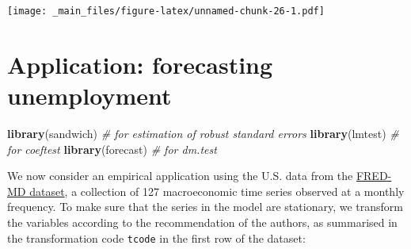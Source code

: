 \documentclass[
]{book}
\newenvironment{Shaded}{\begin{snugshade}}{\end{snugshade}}
\newcommand{\AttributeTok}[1]{\textcolor[rgb]{0.13,0.29,0.53}{#1}}
\newcommand{\CommentTok}[1]{\textcolor[rgb]{0.56,0.35,0.01}{\textit{#1}}}
\newcommand{\DecValTok}[1]{\textcolor[rgb]{0.00,0.00,0.81}{#1}}
\newcommand{\FloatTok}[1]{\textcolor[rgb]{0.00,0.00,0.81}{#1}}
\newcommand{\FunctionTok}[1]{\textcolor[rgb]{0.13,0.29,0.53}{\textbf{#1}}}
\newcommand{\NormalTok}[1]{#1}
\newcommand{\SpecialCharTok}[1]{\textcolor[rgb]{0.81,0.36,0.00}{\textbf{#1}}}
\newcommand{\StringTok}[1]{\textcolor[rgb]{0.31,0.60,0.02}{#1}}
\begin{document}
\begin{Shaded}
\end{Shaded}

\texttt{[image: \_main\_files/figure-latex/unnamed-chunk-26-1.pdf]}

\hypertarget{application-forecasting-unemployment}{%
\section{Application: forecasting unemployment}\label{application-forecasting-unemployment}}

\begin{Shaded}
\begin{Highlighting}[]
\FunctionTok{library}\NormalTok{(sandwich) }\CommentTok{\# for estimation of robust standard errors}
\FunctionTok{library}\NormalTok{(lmtest)   }\CommentTok{\# for coeftest}
\FunctionTok{library}\NormalTok{(forecast) }\CommentTok{\# for dm.test}
\end{Highlighting}
\end{Shaded}

We now consider an empirical application using the U.S. data from the \href{https://research.stlouisfed.org/econ/mccracken/fred-databases/}{FRED-MD dataset}, a collection of 127 macroeconomic time series observed at a monthly frequency.
To make sure that the series in the model are stationary, we transform the variables according to the recommendation of the authors, as summarised in the transformation code \texttt{tcode} in the first row of the dataset:
\end{document}
